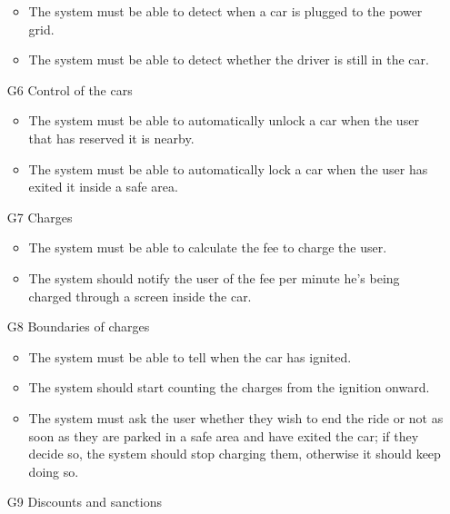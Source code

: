 \begin{itemize}
\begin{itemize}
						\item The system must be able to detect when a car is plugged to the power grid.
						\item The system must be able to detect whether the driver is still in the car.
					\end{itemize}
				\item [G6] Control of the cars %
					\begin{itemize}
						\item The system must be able to automatically unlock a car when the user that has reserved it is nearby.
						\item The system must be able to automatically lock a car when the user has exited it inside a safe area. 
					\end{itemize}
				\item [G7] Charges %
					\begin{itemize}
						\item The system must be able to calculate the fee to charge the user.
						\item The system should notify the user of the fee per minute he's being charged through a screen inside the car.
					\end{itemize}
				\item [G8] Boundaries of charges %
					\begin{itemize}
						\item The system must be able to tell when the car has ignited. 
						\item The system should start counting the charges from the ignition onward. %
						\item The system must ask the user whether they wish to end the ride or not as soon as they are parked in a safe area and have exited the car; if they decide so, the system should stop charging them, otherwise it should keep doing so. 
					\end{itemize}
				\item [G9] Discounts and sanctions %

\end{itemize}
